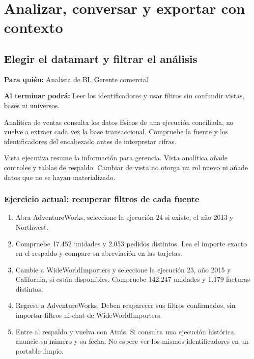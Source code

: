 \chapter{Analizar, conversar y exportar con contexto}
\section{Elegir el datamart y filtrar el análisis}
\label{unidad:AN01}
\textbf{Para quién:} Analista de BI, Gerente comercial\par
\textbf{Al terminar podrá:} Leer los identificadores y usar filtros sin confundir vistas, bases ni universos.

Analítica de ventas consulta los datos físicos de una ejecución conciliada, no vuelve a extraer cada vez la base transaccional. Compruebe la fuente y los identificadores del encabezado antes de interpretar cifras.

Vista ejecutiva resume la información para gerencia. Vista analítica añade controles y tablas de respaldo. Cambiar de vista no otorga un rol nuevo ni añade datos que no se hayan materializado.

\subsection{Ejercicio actual: recuperar filtros de cada fuente}
\begin{enumerate}
\item Abra AdventureWorks, seleccione la ejecución 24 si existe, el año 2013 y Northwest.
\item Compruebe 17.452 unidades y 2.053 pedidos distintos. Lea el importe exacto en el respaldo y compare su abreviación en las tarjetas.
\item Cambie a WideWorldImporters y seleccione la ejecución 23, año 2015 y California, si están disponibles. Compruebe 142.247 unidades y 1.179 facturas distintas.
\item Regrese a AdventureWorks. Deben reaparecer sus filtros confirmados, sin importar filtros ni chat de WideWorldImporters.
\item Entre al respaldo y vuelva con Atrás. Si consulta una ejecución histórica, anuncie su número y su fecha. No espere ver los mismos identificadores en un portable limpio.
\end{enumerate}

